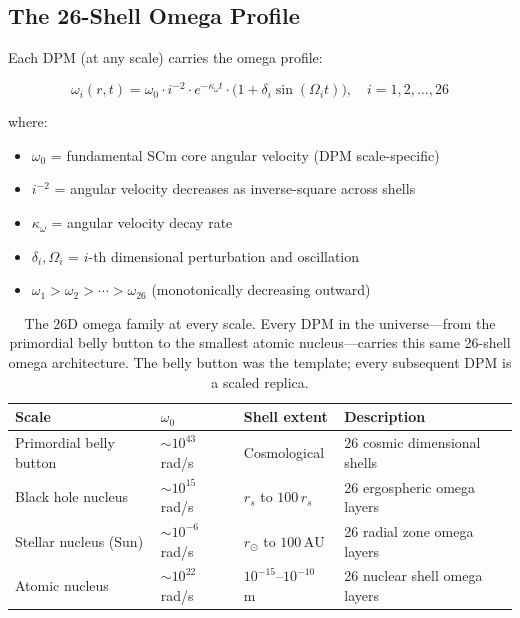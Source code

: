 \documentclass[12pt,a4paper]{article}
\begin{document}
\subsection{The 26-Shell Omega Profile}

Each DPM (at any scale) carries the omega profile:

\begin{equation}
  \omega_i(r, t) = \omega_0 \cdot i^{-2} \cdot e^{-\kappa_\omega t}
    \cdot \bigl(1 + \delta_i \sin(\Omega_i t)\bigr),
  \quad i = 1, 2, \ldots, 26
  \label{eq:omega_profile}
\end{equation}

where:
\begin{itemize}[noitemsep]
  \item $\omega_0$ = fundamental SCm core angular velocity (DPM scale-specific)
  \item $i^{-2}$ = angular velocity decreases as inverse-square across shells
  \item $\kappa_\omega$ = angular velocity decay rate
  \item $\delta_i, \Omega_i$ = $i$-th dimensional perturbation and oscillation
  \item $\omega_1 > \omega_2 > \cdots > \omega_{26}$ (monotonically decreasing outward)
\end{itemize}

\begin{table}[H]
\centering
\begin{tabular}{@{}llll@{}}
\toprule
\textbf{Scale} & \textbf{$\omega_0$} & \textbf{Shell extent} & \textbf{Description} \\
\midrule
Primordial belly button & $\sim10^{43}$ rad/s & Cosmological & 26 cosmic dimensional shells \\
Black hole nucleus & $\sim10^{15}$ rad/s & $r_s$ to $100\,r_s$ & 26 ergospheric omega layers \\
Stellar nucleus (Sun) & $\sim10^{-6}$ rad/s & $r_\odot$ to $100\,\text{AU}$ & 26 radial zone omega layers \\
Atomic nucleus & $\sim10^{22}$ rad/s & $10^{-15}$--$10^{-10}$ m & 26 nuclear shell omega layers \\
\bottomrule
\end{tabular}
\caption{The 26D omega family at every scale.  Every DPM in the universe---from
the primordial belly button to the smallest atomic nucleus---carries this same
26-shell omega architecture.  The belly button was the template; every subsequent
DPM is a scaled replica.}
\label{tab:omega_scales}
\end{table}
\end{document}
